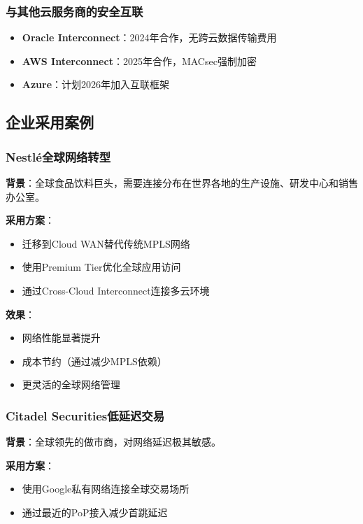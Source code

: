 \subsubsection{与其他云服务商的安全互联}

\begin{itemize}
    \item \textbf{Oracle Interconnect}：2024年合作，无跨云数据传输费用
    \item \textbf{AWS Interconnect}：2025年合作，MACsec强制加密
    \item \textbf{Azure}：计划2026年加入互联框架
\end{itemize}

\subsection{企业采用案例}

\subsubsection{Nestlé全球网络转型}

\textbf{背景}：全球食品饮料巨头，需要连接分布在世界各地的生产设施、研发中心和销售办公室。

\textbf{采用方案}：
\begin{itemize}
    \item 迁移到Cloud WAN替代传统MPLS网络
    \item 使用Premium Tier优化全球应用访问
    \item 通过Cross-Cloud Interconnect连接多云环境
\end{itemize}

\textbf{效果}：
\begin{itemize}
    \item 网络性能显著提升
    \item 成本节约（通过减少MPLS依赖）
    \item 更灵活的全球网络管理
\end{itemize}

\subsubsection{Citadel Securities低延迟交易}

\textbf{背景}：全球领先的做市商，对网络延迟极其敏感。

\textbf{采用方案}：
\begin{itemize}
    \item 使用Google私有网络连接全球交易场所
    \item 通过最近的PoP接入减少首跳延迟
\end{itemize}

